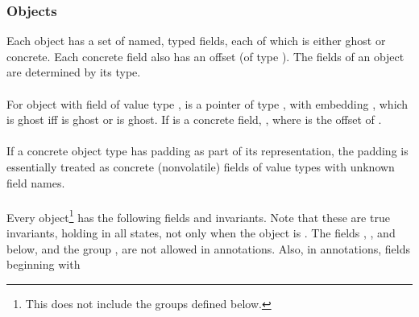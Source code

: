 \documentclass[preprint,nocopyrightspace]{sigplanconf}
\begin{document}
{{\subsubsection{Objects}

Each object has a set of named, typed fields, 
each of which is either ghost or concrete. Each
concrete field also has an offset (of type ). 
The fields of an object are determined by its type. 
\\\\
For object  with field  of value type , 
 is a pointer of type , with 
embedding , which is
ghost iff  is ghost or  is ghost. If  is a
concrete field, ,
where  is the offset of . 
\\\\
If a concrete object type has padding as part of its representation, the
padding is essentially treated as concrete (nonvolatile) fields of
value types with unknown field names.
\\\\
Every object\footnote{This does not include the  groups defined
below.} has the following fields and invariants. Note that these
are true invariants, holding in all states, not only when the object
is \vcc{\closed}. The fields \vcc{\version}, ,
and \vcc{\blobifiable} below, and the
group \vcc{\ownerOb}, are not allowed in annotations. Also, in
annotations, fields beginning with }}
\end{document}
